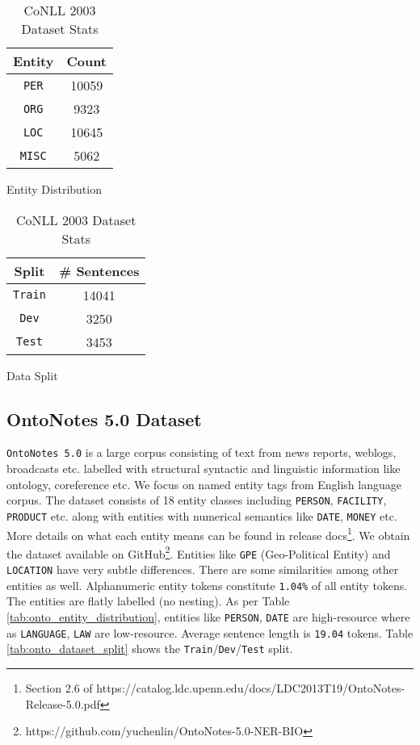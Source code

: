 \begin{table}[h!]
\begin{subtable}[t]{.48\linewidth}
\centering
\begin{tabular}{|c|c|}\hline
	\textbf{Entity} & \textbf{Count}\\\hline
	\texttt{PER} & 10059\\\hline
	\texttt{ORG} & 9323\\\hline
	\texttt{LOC} & 10645\\\hline
	\texttt{MISC} & 5062\\\hline
	\end{tabular}
	\caption{Entity Distribution}
	\label{tab:conll_entity_distribution}
\end{subtable}
\begin{subtable}[t]{.48\linewidth}
\centering
\begin{tabular}{|c|c|}\hline
	\textbf{Split} & \textbf{\# Sentences}\\\hline
	\texttt{Train} & 14041\\\hline
	\texttt{Dev} & 3250\\\hline
	\texttt{Test} & 3453\\\hline
	\end{tabular}
	\caption{Data Split}
	\label{tab:conll_dataset_split}
\end{subtable}
\caption{CoNLL 2003 Dataset Stats}
\end{table}

\subsection{OntoNotes 5.0 Dataset}

\texttt{OntoNotes 5.0}\cite{} is a large corpus consisting of text from news reports, weblogs, broadcasts etc. labelled with structural syntactic and linguistic information like ontology, coreference etc. We focus on named entity tags from English language corpus. The dataset consists of 18 entity classes including \texttt{PERSON}, \texttt{FACILITY}, \texttt{PRODUCT} etc. along with entities with numerical semantics like \texttt{DATE}, \texttt{MONEY} etc. More details on what each entity means can be found in release docs\footnote{Section 2.6 of https://catalog.ldc.upenn.edu/docs/LDC2013T19/OntoNotes-Release-5.0.pdf}. We obtain the dataset available on GitHub\footnote{https://github.com/yuchenlin/OntoNotes-5.0-NER-BIO}. Entities like \texttt{GPE} (Geo-Political Entity) and \texttt{LOCATION} have very subtle differences. There are some similarities among other entities as well. Alphanumeric entity tokens constitute \texttt{1.04\%} of all entity tokens. The entities are flatly labelled (no nesting). As per Table \ref{tab:onto_entity_distribution}, entities like \texttt{PERSON}, \texttt{DATE} are high-resource where as \texttt{LANGUAGE}, \texttt{LAW} are low-resource. Average sentence length is \texttt{19.04} tokens. Table \ref{tab:onto_dataset_split} shows the \texttt{Train}/\texttt{Dev}/\texttt{Test} split. 

